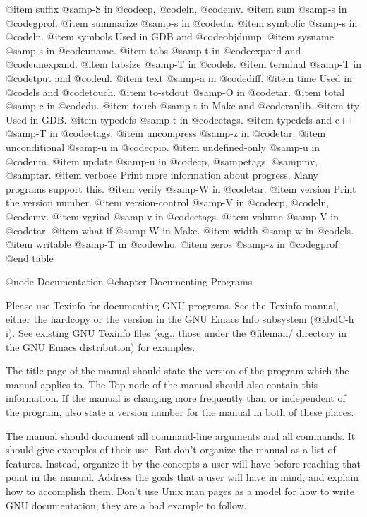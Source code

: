 @item suffix
@samp{-S} in @code{cp}, @code{ln}, @code{mv}.
@item sum
@samp{-s} in @code{gprof}.
@item summarize
@samp{-s} in @code{du}.
@item symbolic
@samp{-s} in @code{ln}.
@item symbols
Used in GDB and @code{objdump}.
@item sysname
@samp{-s} in @code{uname}.
@item tabs
@samp{-t} in @code{expand} and @code{unexpand}.
@item tabsize
@samp{-T} in @code{ls}.
@item terminal
@samp{-T} in @code{tput} and @code{ul}.
@item text
@samp{-a} in @code{diff}.
@item time
Used in @code{ls} and @code{touch}.
@item to-stdout
@samp{-O} in @code{tar}.
@item total
@samp{-c} in @code{du}.
@item touch
@samp{-t} in Make and @code{ranlib}.
@item tty
Used in GDB.
@item typedefs
@samp{-t} in @code{etags}.
@item typedefs-and-c++
@samp{-T} in @code{etags}.
@item uncompress
@samp{-z} in @code{tar}.
@item unconditional
@samp{-u} in @code{cpio}.
@item undefined-only
@samp{-u} in @code{nm}.
@item update
@samp{-u} in @code{cp}, @samp{etags}, @samp{mv}, @samp{tar}.
@item verbose
Print more information about progress.  Many programs support this.
@item verify
@samp{-W} in @code{tar}.
@item version
Print the version number.
@item version-control
@samp{-V} in @code{cp}, @code{ln}, @code{mv}.
@item vgrind
@samp{-v} in @code{etags}.
@item volume
@samp{-V} in @code{tar}.
@item what-if
@samp{-W} in Make.
@item width
@samp{-w} in @code{ls}.
@item writable
@samp{-T} in @code{who}.
@item zeros
@samp{-z} in @code{gprof}.
@end table

@node Documentation
@chapter Documenting Programs

Please use Texinfo for documenting GNU programs.  See the Texinfo
manual, either the hardcopy or the version in the GNU Emacs Info
subsystem (@kbd{C-h i}).  See existing GNU Texinfo files (e.g., those
under the @file{man/} directory in the GNU Emacs distribution) for
examples.

The title page of the manual should state the version of the program
which the manual applies to.  The Top node of the manual should also
contain this information.  If the manual is changing more frequently
than or independent of the program, also state a version number for
the manual in both of these places.

The manual should document all command-line arguments and all
commands.  It should give examples of their use.  But don't organize
the manual as a list of features.  Instead, organize it by the
concepts a user will have before reaching that point in the manual.
Address the goals that a user will have in mind, and explain how to
accomplish them.  Don't use Unix man pages as a model for how to
write GNU documentation; they are a bad example to follow.

